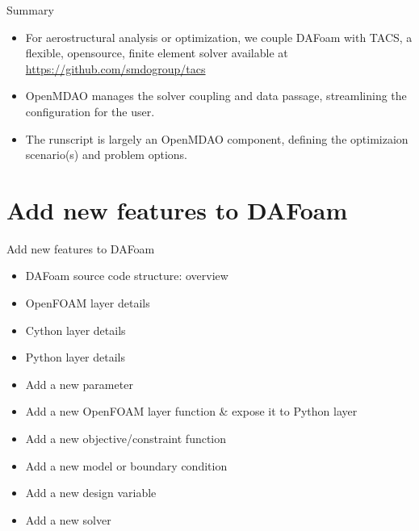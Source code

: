 \documentclass{bredelebeamer}
\begin{document}
\begin{frame}[fragile]{Summary}
  \begin{itemize}
    \setlength\itemsep{1em}
    \item For aerostructural analysis or optimization, we couple DAFoam with TACS, a flexible, opensource, finite element solver available at \url{https://github.com/smdogroup/tacs}
    \item OpenMDAO manages the solver coupling and data passage, streamlining the configuration for the user.
    \item The runscript is largely an OpenMDAO component, defining the optimizaion scenario(s) and problem options.
  \end{itemize}
\end{frame}


\section{Add new features to DAFoam}
\renewcommand{\arraystretch}{2}

\begin{frame}{}
  \center \Large Add new features to DAFoam
  \normalsize
  \begin{itemize}
    \setlength\itemsep{1em}
    \item DAFoam source code structure: overview
    \item OpenFOAM layer details
    \item Cython layer details
    \item Python layer details
    \item Add a new parameter
    \item Add a new OpenFOAM layer function \& expose it to Python layer
    \item Add a new objective/constraint function
    \item Add a new model or boundary condition
    \item Add a new design variable
    \item Add a new solver
  \end{itemize}
\end{frame}
\end{document}
